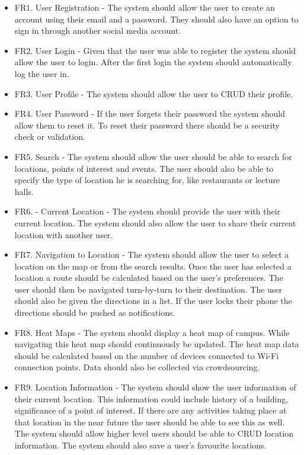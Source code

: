 \documentclass[11pt]{article}
\begin{document}
		\begin{itemize}
			\item FR1. User Registration - The system should allow the user to create an account using their email and a password. They should also have an option to sign in through another social media account.
			
			\item FR2. User Login - Given that the user was able to register the system should allow the user to login. After the first login the system should automatically log the user in.
			
			\item FR3. User Profile - The system should allow the user to CRUD their profile.
			
			\item FR4. User Password - If the user forgets their password the system should allow them to reset it. To reset their password there should be a security check or validation.
			
			\item FR5. Search - The system should allow the user should be able to search for locations, points of interest and events. The user should also be able to specify the type of location he is searching for, like restaurants or lecture halls.
			
			\item FR6. - Current Location - The system should provide the user with their current location. The system should also allow the user to share their current location with another user.
			
			\item FR7. Navigation to Location - The system should allow the user to select a location on the map or from the search results. Once the user has selected a location a route should be calculated based on the user's preferences. The user should then be navigated turn-by-turn to their destination. The user should also be given the directions in a list. If the user locks their phone the directions should be pushed as notifications.
			
			\item FR8. Heat Maps - The system should display a heat map of campus. While navigating this heat map should continuously be updated. The heat map data should be calculated based on the number of devices connected to Wi-Fi connection points. Data should also be collected via crowdsourcing. 
			
			\item FR9. Location Information - The system should show the user information of their current location. This information could include history of a building, significance of a point of interest. If there are any activities taking place at that location in the near future the user should be able to see this as well. The system should allow higher level users should be able to CRUD location information. The system should also save a user's favourite locations.
			

\end{itemize}
\end{document}
